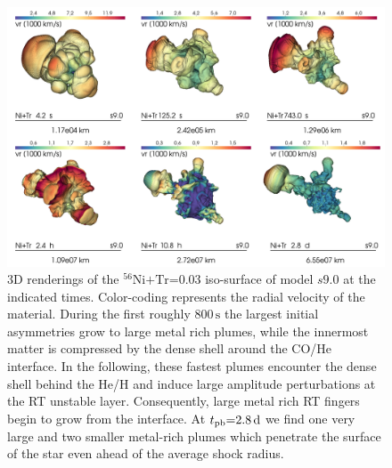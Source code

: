 \documentclass[fleqn,usenatbib]{mnras}
\newcommand{\tpb}{\ensuremath{t_{\text{pb}}}}
\newcommand{\nickel}{\ensuremath{\mathrm{^{56}Ni}}\xspace}
\newcommand{\tracer}{\ensuremath{\mathrm{Tr}}\xspace}
\newcommand{\s}{\ensuremath{\text{s}}}
\begin{document}
\begin{figure}%
\includegraphics[width=\textwidth]{pic/s9_tile_2_3.png}
    \caption{3D renderings of the $\nickel\mathord{+}\tracer\mathord{=}0.03$ 
             iso-surface of model $s9.0$ at the indicated times. Color-coding represents the radial velocity of the material. During the first roughly $800\,\s$ the largest initial asymmetries grow to large metal rich plumes, while the innermost matter is compressed by the dense shell around the CO/He interface. In the following, these fastest plumes encounter the dense shell behind the He/H and induce large amplitude perturbations at the RT unstable layer. Consequently, large metal rich RT fingers begin to grow from the interface. At $\tpb\mathord{=}2.8\,\rm d$ we find one very large and two smaller metal-rich plumes which penetrate the surface of the star even ahead of the average shock radius.}
\label{fig:s9 3d rendering}
\end{figure}%
\end{document}
